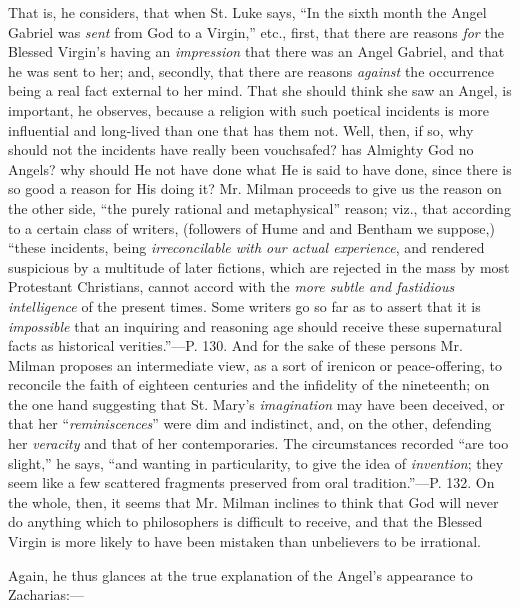 That is, he considers, that when St. Luke says, ``In
the sixth month the Angel Gabriel was \emph{sent} from God to a
Virgin,'' etc., first, that there are reasons \emph{for} the Blessed
Virgin's having an \emph{impression} that there was an Angel Gabriel,
and that he was sent to her; and, secondly, that there are reasons \emph{against}
the occurrence being a real fact external to her mind. That she should
think she saw an Angel, is important, he observes, because a religion
with such poetical incidents is more influential and long-lived than
one that has them not. Well, then, if so, why should not the incidents
have really been vouchsafed? has Almighty God no Angels? why should He
not have done what He is said to have done, since there is so good a
reason for His doing it? Mr. Milman proceeds to give us the reason on
the other side, ``the purely rational and metaphysical'' reason; viz.,
that according to a certain class of writers, (followers of Hume and
and Bentham we suppose,) ``these incidents, being \emph{irreconcilable
with our actual experience}, and rendered suspicious by a multitude
of later fictions, which are rejected in the mass by most Protestant
Christians, cannot accord with the \emph{more subtle and fastidious
intelligence} of the present times. Some writers go so far as to
assert that it is \emph{impossible} that an inquiring and reasoning
age should receive these supernatural facts as historical verities.''—P.
130. And for the sake of these persons Mr. Milman proposes an
intermediate view, as a sort of irenicon or peace-offering, to
reconcile the faith of eighteen centuries and the infidelity of
the nineteenth; on the one hand suggesting that St. Mary's \emph{imagination}
may have been deceived, or that her ``\emph{reminiscences}'' were dim
and indistinct, and, on the other, defending her \emph{veracity} and
that of her contemporaries. The circumstances recorded ``are too
slight,'' he says, ``and wanting in particularity, to give the idea of \emph{invention};
they seem like a few scattered fragments preserved from oral
tradition.''—P. 132. On the whole, then, it seems that Mr. Milman
inclines to think that God will never do anything which to
philosophers is difficult to receive, and that the Blessed Virgin is
more likely to have been mistaken than unbelievers to be irrational.

Again, he thus glances at the true explanation of
the Angel's appearance to Zacharias:—

